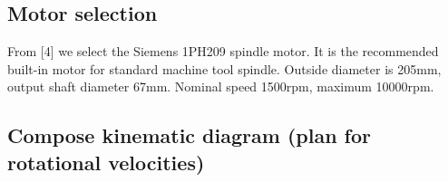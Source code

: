 \documentclass{article}
\begin{document}
\FPeval{}
\vExample

\subsection{Motor selection}
From [4] we select the Siemens 1PH209 spindle motor.
It is the recommended built-in motor for standard machine tool spindle.
Outside diameter is 205mm, output shaft diameter 67mm.
Nominal speed 1500rpm, maximum 10000rpm.

\subsection{Compose kinematic diagram (plan for rotational velocities)}
\end{document}

